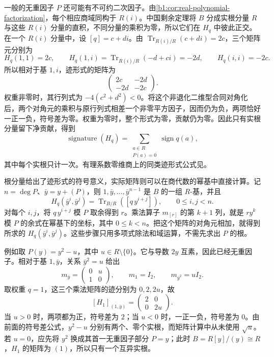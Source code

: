 \begin{proofsketch}
	一般的无重因子 \(P\) 还可能有不可约二次因子。由\cref{b1:cor:real-polynomial-factorization}，每个相应商域同构于 \(R(i)\)。中国剩余定理将 \(B\) 分成实根分量 \(R\) 与这些 \(R(i)\) 分量的直积，不同分量的乘积为零，所以它们在 \(H_q\) 中彼此正交。在一个 \(R(i)\) 分量中，设 \([q]=c+di\)。由 \(\operatorname{Tr}_{R(i)/R}(c+di)=2c\)，三个矩阵元分别为
	\[
		H_q(1,1)=2c,\qquad H_q(1,i)=\operatorname{Tr}_{R(i)/R}(-d+ci)=-2d,\qquad H_q(i,i)=-2c.
	\]
	所以相对于基 \(1,i\)，迹形式的矩阵为
	\[
		\begin{pmatrix}2c&-2d\\-2d&-2c\end{pmatrix}.
	\]
	权重非零时，其行列式为 \(-4(c^2+d^2)<0\)。将这个非退化二维型合同对角化后，两个对角元的乘积与原行列式相差一个非零平方因子，因而仍为负，两项恰好一正一负，符号差为零。权重为零时，整个形式为零，贡献仍为零。因此只有实根分量留下净贡献，得到
	\[
		\operatorname{signature}(H_q)=\sum_{\substack{a\in R\\P(a)=0}}\operatorname{sign}q(a),
	\]
	其中每个实根只计一次。有理系数零维商上的同类迹形式公式见\cite[Section 2.4, Theorem 2.8]{Sturmfels2002PolynomialEquations}。

	根分量给出了迹形式的符号意义，实际矩阵则可以在商代数的幂基中直接计算。记 \(n=\deg P\)、\(\bar y=y+(P)\)，则 \(1,\bar y,\ldots,\bar y^{n-1}\) 是 \(B\) 的一组 \(R\)-基，并且
	\[
		H_q(\bar y^i,\bar y^j) =\operatorname{Tr}_{B/R}([q\,y^{i+j}]), \qquad 0\leq i,j<n.
	\]
	对每个 \(i,j\)，将 \(q\,y^{i+j}\) 模 \(P\) 取余得到 \(r\)。乘法算子 \(m_{[r]}\) 的第 \(k+1\) 列，就是 \(r y^k\) 模 \(P\) 的余式在幂基下的坐标，其中 \(0\leq k<n\)。把这个矩阵的对角元相加，就得到所求的 \(H_q(\bar y^i,\bar y^j)\)。这些步骤只用多项式除法和域运算，不需先求出 \(P\) 的根。

	例如取 \(P(y)=y^2-u\)，其中 \(u\in R\setminus\{0\}\)。它与导数 \(2y\) 互素，因此已经无重因子。相对于基 \(1,\bar y\)，关系 \(\bar y^2=u\) 给出
	\[
		m_{\bar y}=\begin{pmatrix}0&u\\1&0\end{pmatrix},\qquad
		m_1=I_2,\qquad m_{\bar y^2}=uI_2.
	\]
	取权重 \(q=1\)，这三个乘法矩阵的迹分别为 \(0,2,2u\)，故
	\[
		[H_1]_{(1,\bar y)}
		=\begin{pmatrix}2&0\\0&2u\end{pmatrix}.
	\]
	当 \(u>0\) 时，两项都为正，符号差为 \(2\)；当 \(u<0\) 时，一正一负，符号差为 \(0\)。由前面的符号差公式，\(y^2-u\) 分别有两个、零个实根，而矩阵计算中从未使用 \(\sqrt u\)。若 \(u=0\)，应先将 \(y^2\) 换成其首一无重因子部分 \(P=y\)；此时 \(B=R[y]/(y)\cong R\)，\(H_1\) 的矩阵为 \((1)\)，所以只有一个互异实根。


\end{proofsketch}
